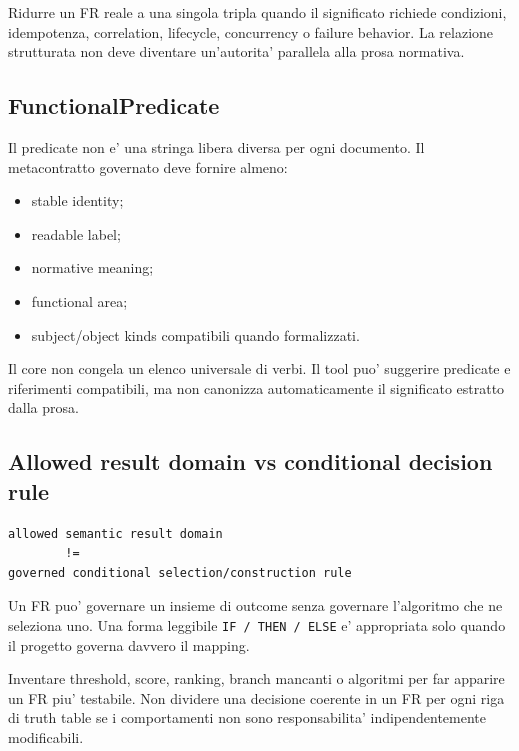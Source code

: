 \documentclass[11pt,a4paper]{article}
\begin{document}
\begin{ddtaanti}
Ridurre un FR reale a una singola tripla quando il significato richiede condizioni, idempotenza, correlation, lifecycle, concurrency o failure behavior. La relazione strutturata non deve diventare un'autorita' parallela alla prosa normativa.
\end{ddtaanti}

\subsection{FunctionalPredicate}
\closedtag

Il predicate non e' una stringa libera diversa per ogni documento. Il metacontratto governato deve fornire almeno:
\begin{itemize}
  \item stable identity;
  \item readable label;
  \item normative meaning;
  \item functional area;
  \item subject/object kinds compatibili quando formalizzati.
\end{itemize}

Il core non congela un elenco universale di verbi. Il tool puo' suggerire predicate e riferimenti compatibili, ma non canonizza automaticamente il significato estratto dalla prosa.

\subsection{Allowed result domain vs conditional decision rule}
\closedtag

\begin{lstlisting}
allowed semantic result domain
        !=
governed conditional selection/construction rule
\end{lstlisting}

Un FR puo' governare un insieme di outcome senza governare l'algoritmo che ne seleziona uno. Una forma leggibile \texttt{IF / THEN / ELSE} e' appropriata solo quando il progetto governa davvero il mapping.

\begin{ddtaanti}
Inventare threshold, score, ranking, branch mancanti o algoritmi per far apparire un FR piu' testabile. Non dividere una decisione coerente in un FR per ogni riga di truth table se i comportamenti non sono responsabilita' indipendentemente modificabili.
\end{ddtaanti}
\end{document}
